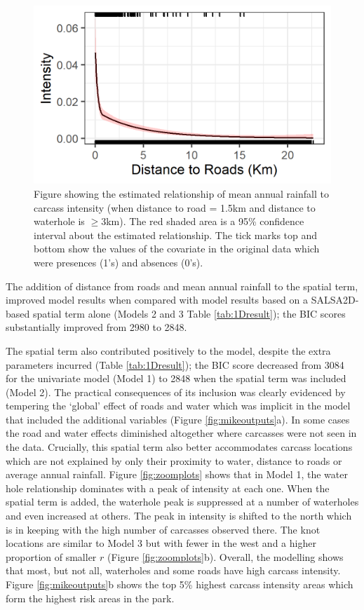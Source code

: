 \documentclass[letterpaper, 12pt]{interact}
\begin{document}
	
	
	\begin{figure}[!ht]
		\centering
		\includegraphics[width=0.7\linewidth]{images/Figure7.jpg}
		\caption{Figure showing the estimated relationship of mean annual rainfall to carcass intensity (when distance to road = 1.5km and distance to waterhole is $\geq3$km).  The red shaded area is a 95\% confidence interval about the estimated relationship. The tick marks top and bottom show the values of the covariate in the original data which were presences (1's) and absences (0's).}
		\label{fig:mikeresultpartialrain}
	\end{figure}
	
	
	The addition of distance from roads and mean annual rainfall to the spatial term, improved model results when compared with model results based on a SALSA2D-based spatial term alone (Models 2 and 3 Table \ref{tab:1Dresult}); the BIC scores substantially improved from 2980 to 2848.
	
	The spatial term also contributed positively to the model, despite the extra parameters incurred (Table \ref{tab:1Dresult}); the BIC score decreased from 3084 for the univariate model (Model 1) to 2848 when the spatial term was included (Model 2). The practical consequences of its inclusion was clearly evidenced by tempering the `global' effect of roads and water which was implicit in the model that included the additional variables (Figure \ref{fig:mikeoutputs}a). In some cases the road and water effects diminished altogether where carcasses were not seen in the data. Crucially, this spatial term also better accommodates carcass locations which are not explained by only their proximity to water, distance to roads or average annual rainfall. Figure \ref{fig:zoomplots} shows that in Model 1, the water hole relationship dominates with a peak of intensity at each one. When the spatial term is added, the waterhole peak is suppressed at a number of waterholes and even increased at others. The peak in intensity is shifted to the north which is in keeping with the high number of carcasses observed there. The knot locations are similar to Model 3 but with fewer in the west and a higher proportion of smaller $r$ (Figure \ref{fig:zoomplots}b). Overall, the modelling shows that most, but not all, waterholes and some roads have high carcass intensity. Figure \ref{fig:mikeoutputs}b shows the top 5\% highest carcass intensity areas which form the highest risk areas in the park. 
	
\end{document}

